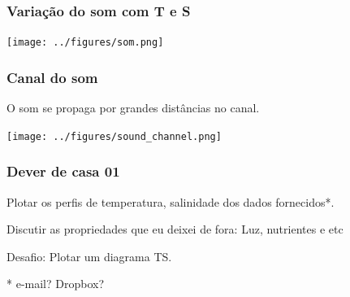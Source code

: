 \begin{frame}
\frametitle{Variação do som com T e S}
    \begin{center}
        \texttt{[image: ../figures/som.png]}
    \end{center}
\end{frame}


\begin{frame}
\frametitle{Canal do som}
  \begin{block}{}
    O som se propaga por grandes distâncias no canal.
  \end{block}

    \begin{center}
        \texttt{[image: ../figures/sound\_channel.png]}
    \end{center}
\end{frame}


\begin{frame}
\frametitle{Dever de casa 01}
  \begin{block}{}
    Plotar os perfis de temperatura, salinidade dos dados fornecidos*.

    Discutir as propriedades que eu deixei de fora: Luz, nutrientes e etc

    Desafio: Plotar um diagrama TS.
    \end{block}

    \pause
    \begin{block}{}
        * e-mail? Dropbox?
    \end{block}
\end{frame}



